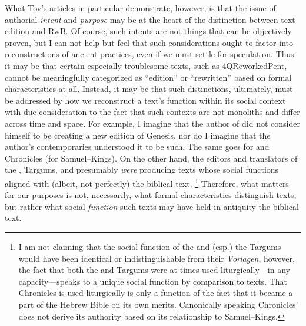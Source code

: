 What Tov's articles in particular demonstrate, however, is that the issue of authorial \emph{intent} and \emph{purpose} may be at the heart of the distinction between text edition and RwB. Of course, such intents are not things that can be objectively proven, but I can not help but feel that such considerations ought to factor into reconstructions of ancient practices, even if we must settle for speculation. Thus it may be that certain especially troublesome texts, such as 4QReworkedPent, cannot be meaningfully categorized as ``edition'' or ``rewritten'' based on formal characteristics at all. Instead, it may be that such distinctions, ultimately, must be addressed by how we reconstruct a text's function within its social context with due consideration to the fact that such contexts are not monoliths and differ across time and space. For example, I imagine that the author of \ga did not consider himself to be creating a new edition of Genesis, nor do I imagine that the author's contemporaries understood it to be such. The same goes for \jub and Chronicles (for Samuel--Kings). On the other hand, the editors and translators of the \sampent, Targums, and \lxx presumably \emph{were} producing texts whose social functions aligned with (albeit, not perfectly) the biblical text.%
%
\footnote{I am not claiming that the social function of the \lxx and (esp.) the Targums would have been identical or indistinguishable from their \emph{Vorlagen}, however, the fact that both the \lxx and Targums were at times used liturgically---in any capacity---speaks to a unique social function by comparison to \rwb texts. That Chronicles is used liturgically is only a function of the fact that it became a part of the Hebrew Bible on its own merits. Canonically speaking Chronicles' does not derive its authority based on its relationship to Samuel--Kings.}
%
Therefore, what matters for our purposes is not, necessarily, what formal characteristics distinguish \rwb texts, but rather what social \emph{function} such texts may have held in antiquity \visavis the biblical text.